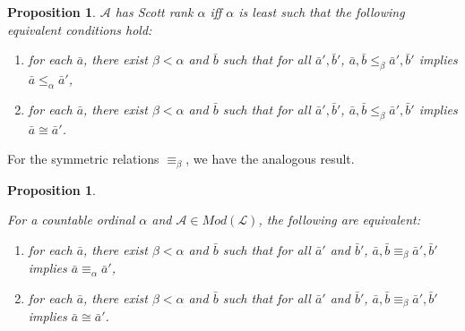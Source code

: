 \documentclass{article}
\newtheorem{prop}[thm]{Proposition}
\theoremstyle{definition}
\begin{document}
	\begin{prop}
		
		$\mathcal{A}$ has Scott rank $\alpha$ iff $\alpha$ is least such that the following equivalent conditions hold:
		
		\begin{enumerate}
			
			\item for each $\bar{a}$, there exist $\beta < \alpha$ and $\bar{b}$ such that for all $\bar{a}',\bar{b}'$, $\bar{a},\bar{b}\leq_\beta \bar{a}',\bar{b}'$ implies $\bar{a}\leq_\alpha\bar{a}'$, 
			
			\item for each $\bar{a}$, there exist $\beta < \alpha$ and $\bar{b}$ such that for all 
			$\bar{a}',\bar{b}'$, $\bar{a},\bar{b}\leq_\beta\bar{a}',\bar{b}'$ implies $\bar{a}\cong\bar{a}'$. 
			
		\end{enumerate}
		
	\end{prop}
	
	For the symmetric relations $\equiv_\beta$, we have the analogous result.
	
	\begin{prop}
		\label{prop5}
		
		For a countable ordinal $\alpha$ and $\mathcal{A}\in Mod(\mathcal{L})$, the following are equivalent:
		
		\begin{enumerate}
			
			\item for each $\bar{a}$, there exist $\beta < \alpha$ and $\bar{b}$ such that for all $\bar{a}'$ and 
			$\bar{b}'$, $\bar{a},\bar{b}\equiv_\beta\bar{a}',\bar{b}'$ implies $\bar{a}\equiv_\alpha\bar{a}'$,
			
			\item for each $\bar{a}$, there exist $\beta < \alpha$ and $\bar{b}$ such that for all $\bar{a}'$ and 
			$\bar{b}'$, $\bar{a},\bar{b}\equiv_\beta\bar{a}',\bar{b}'$ implies $\bar{a}\cong\bar{a}'$.
			
		\end{enumerate}
		
	\end{prop}
	
\end{document}
